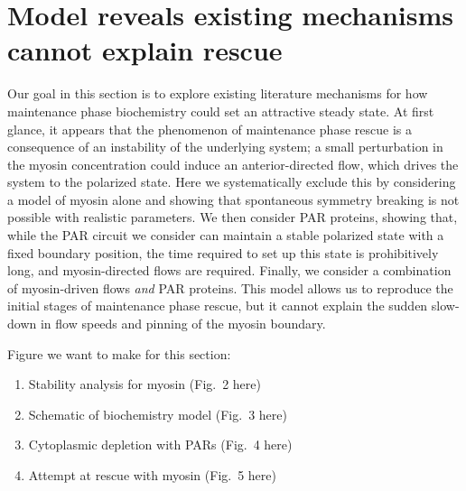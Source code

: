 \documentclass[11pt]{article}
\newcommand{\red}[1]{\color{red}#1\normalcolor}
\newcommand{\6}[1]{#1_{\text{6}}}
\newcommand{\3}[1]{#1_{\text{3}}}
\begin{document}
\section{Model reveals existing mechanisms cannot explain rescue }
Our goal in this section is to explore existing literature mechanisms for how maintenance phase biochemistry could set an attractive steady state. At first glance, it appears that the phenomenon of maintenance phase rescue is a consequence of an instability of the underlying system; a small perturbation in the myosin concentration could induce an anterior-directed flow, which drives the system to the polarized state. Here we systematically exclude this by considering a model of myosin alone and showing that spontaneous symmetry breaking is not possible with realistic parameters. We then consider PAR proteins, showing that, while the PAR circuit we consider can maintain a stable polarized state with a fixed boundary position, the time required to set up this state is prohibitively long, and myosin-directed flows are required. Finally, we consider a combination of myosin-driven flows \emph{and} PAR proteins. This model allows us to reproduce the initial stages of maintenance phase rescue, but it cannot explain the sudden slow-down in flow speeds and pinning of the myosin boundary.

\red{Figure we want to make for this section:
\begin{enumerate}[label=(\alph*),topsep=0pt,itemsep=-2ex]
\item Stability analysis for myosin (Fig.\ 2 here)
\item Schematic of biochemistry model (Fig.\ 3 here)
\item Cytoplasmic depletion with PARs (Fig.\ 4 here)
\item Attempt at rescue with myosin (Fig.\ 5 here)
\end{enumerate}
}
\end{document}
